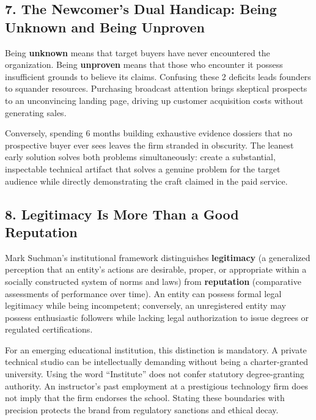 \subsection*{7. The Newcomer's Dual Handicap: Being Unknown and Being Unproven}

Being \textbf{unknown} means that target buyers have never encountered the organization. Being \textbf{unproven} means that those who encounter it possess insufficient grounds to believe its claims. Confusing these 2 deficits leads founders to squander resources. Purchasing broadcast attention brings skeptical prospects to an unconvincing landing page, driving up customer acquisition costs without generating sales.

Conversely, spending 6 months building exhaustive evidence dossiers that no prospective buyer ever sees leaves the firm stranded in obscurity. The leanest early solution solves both problems simultaneously: create a substantial, inspectable technical artifact that solves a genuine problem for the target audience while directly demonstrating the craft claimed in the paid service.

\subsection*{8. Legitimacy Is More Than a Good Reputation}

Mark Suchman's institutional framework distinguishes \textbf{legitimacy} (a generalized perception that an entity's actions are desirable, proper, or appropriate within a socially constructed system of norms and laws) from \textbf{reputation} (comparative assessments of performance over time). An entity can possess formal legal legitimacy while being incompetent; conversely, an unregistered entity may possess enthusiastic followers while lacking legal authorization to issue degrees or regulated certifications.

For an emerging educational institution, this distinction is mandatory. A private technical studio can be intellectually demanding without being a charter-granted university. Using the word ``Institute'' does not confer statutory degree-granting authority. An instructor's past employment at a prestigious technology firm does not imply that the firm endorses the school. Stating these boundaries with precision protects the brand from regulatory sanctions and ethical decay.
